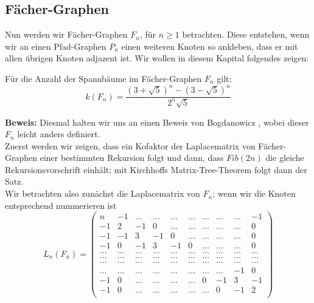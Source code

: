 \subsection{Fächer-Graphen}
Nun werden wir Fächer-Graphen $F_n$, für $n \geq 1$ betrachten. Diese entstehen, wenn wir an einen Pfad-Graphen $P_{n}$ einen weiteren Knoten so ankleben, dass er mit allen übrigen Knoten adjazent ist. 
Wir wollen in diesem Kapital folgendes zeigen:
\begin{Tms}
 Für die Anzahl der Spannbäume im Fächer-Graphen $F_n$ gilt:
 \begin{equation}
  \mathit{k}(F_n)=\frac{(3+\sqrt{5})^{n}-(3-\sqrt{5})^{n}}{2^{n}\sqrt{5}}
 \end{equation}
 \label{ThmFn}
\end{Tms}
\textbf{Beweis:}
Diesmal halten wir uns an einen Beweis von Bogdanowicz \cite{bogdanowicz_2008}, wobei dieser $F_n$ leicht anders definiert.\\
Zuerst werden wir zeigen, dass ein Kofaktor der Laplacematrix von Fächer-Graphen einer bestimmten Rekursion folgt und dann, dass $Fib(2n)$ die gleiche Rekursionsvorschrift einhält; mit Kirchhoffs Matrix-Tree-Theorem folgt dann der Satz.\\
Wir betrachten also zunächst die Laplacematrix von $F_n$; wenn wir die Knoten entsprechend nummerieren ist\\
\begin{equation}
L_n(F_n)=
\begin{pmatrix}
n&-1&\ldots&\ldots&\ldots&\ldots&\ldots&\ldots&\ldots&-1\\
-1&2&-1&0&\ldots&\ldots&\ldots&\ldots&\ldots&0\\
-1&-1&3&-1&0&\ldots&\ldots&\ldots&\ldots&0\\
-1&0&-1&3&-1&0&\ldots&\ldots&\ldots&0\\
\ldots&\ldots&\ldots&\ldots&\ldots&\ldots&\ldots&\ldots&\ldots&\ldots\\
\ldots&\ldots&\ldots&\ldots&\ldots&\ldots&\ldots&\ldots&\ldots&\ldots\\
\ldots&\ldots&\ldots&\ldots&\ldots&\ldots&\ldots&\ldots&\ldots&\ldots\\
\ldots&\ldots&\ldots&\ldots&\ldots&\ldots&\ldots&\ldots&-1&0\\
-1&0&\ldots&\ldots&\ldots&\ldots&0&-1&3&-1\\
-1&0&\ldots&\ldots&\ldots&\ldots&\ldots&0&-1&2\\
\end{pmatrix}
\end{equation}
